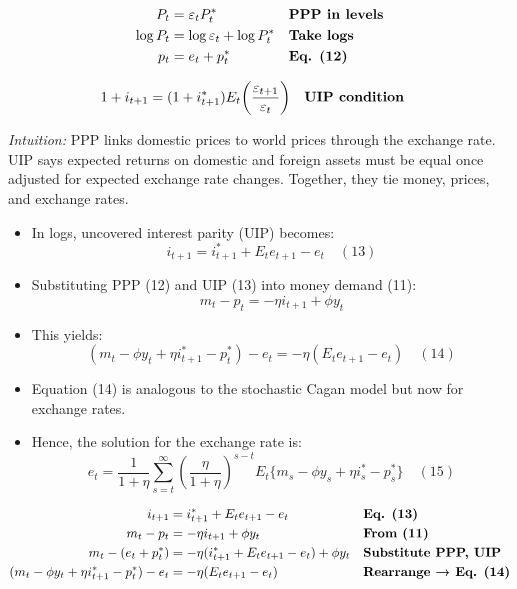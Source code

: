 \documentclass[12pt]{article}
\begin{document}
\singlespacing
\begin{align}
P_t &= \varepsilon_t P_t^* && \text{\textbf{PPP in levels}} \\
\log P_t &= \log \varepsilon_t + \log P_t^* && \text{\textbf{Take logs}} \\
p_t &= e_t + p_t^* && \text{\textbf{Eq. (12)}}
\end{align}

\begin{align}
1 + i_{t+1} &= (1 + i_{t+1}^*) E_t\!\left(\frac{\varepsilon_{t+1}}{\varepsilon_t}\right) && \text{\textbf{UIP condition}}
\end{align}


\textit{Intuition:}  
PPP links domestic prices to world prices through the exchange rate. UIP says expected returns on domestic and foreign assets must be equal once adjusted for expected exchange rate changes. Together, they tie money, prices, and exchange rates.

\begin{itemize}
    \item In logs, uncovered interest parity (UIP) becomes:  
    \[
        i_{t+1} = i_{t+1}^* + E_t e_{t+1} - e_t \quad (13)
    \]  
    \item Substituting PPP (12) and UIP (13) into money demand (11):  
    \[
        m_t - p_t = -\eta i_{t+1} + \phi y_t
    \]  
    \item This yields:  
    \[
        (m_t - \phi y_t + \eta i_{t+1}^* - p_t^*) - e_t = -\eta(E_t e_{t+1} - e_t) \quad (14)
    \]  
    \item Equation (14) is analogous to the stochastic Cagan model but now for exchange rates.  
    \item Hence, the solution for the exchange rate is:  
    \[
        e_t = \frac{1}{1+\eta}\sum_{s=t}^\infty \left(\frac{\eta}{1+\eta}\right)^{s-t} E_t\{m_s - \phi y_s + \eta i_s^* - p_s^*\} \quad (15)
    \]  
\end{itemize}

\singlespacing
\begin{align}
i_{t+1} &= i_{t+1}^* + E_t e_{t+1} - e_t && \text{\textbf{Eq. (13)}} \\
m_t - p_t &= -\eta i_{t+1} + \phi y_t && \text{\textbf{From (11)}} \\
m_t - (e_t + p_t^*) &= -\eta(i_{t+1}^* + E_t e_{t+1} - e_t) + \phi y_t && \text{\textbf{Substitute PPP, UIP}} \\
(m_t - \phi y_t + \eta i_{t+1}^* - p_t^*) - e_t &= -\eta(E_t e_{t+1} - e_t) && \text{\textbf{Rearrange → Eq. (14)}}
\end{align}
\end{document}
